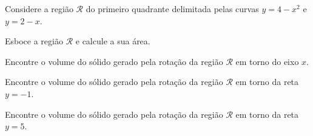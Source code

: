 \begin{exercises}
\begin{exercise}
Considere a região $\mathcal{R}$ do primeiro quadrante delimitada pelas
curvas $y=4-x^2$ e $y=2-x$.
\begin{alphalist}
  \item Esboce a região $\mathcal{R}$ e calcule a sua área.
  \item Encontre o volume do sólido gerado pela rotação da região $\mathcal{R}$ em torno do eixo $x$.
  \item Encontre o volume do sólido gerado pela rotação da região $\mathcal{R}$ em torno da reta $y=-1$.
  \item Encontre o volume do sólido gerado pela rotação da região $\mathcal{R}$ em torno da reta $y=5$.
\end{alphalist}
\begin{answer}
\begin{mathlist}[2]
  \item {}
  \item {}
  \item {}
  \item {}
\end{mathlist}
\end{answer}
\end{exercise}


\end{exercises}
